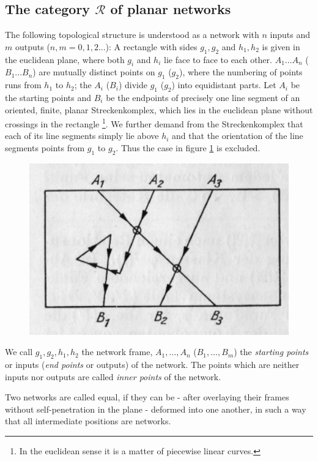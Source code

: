 \documentclass{article}
\begin{document}
\subsection{The category $\mathcal{R}$ of planar networks}
The following topological structure is understood as a network with $n$ inputs and $m$ outputs ($n, m = 0, 1, 2...$):
A rectangle with sides $g_1, g_2$ and $h_1, h_2$ is given in the euclidean plane, where both $g_i$ and $h_i$ lie face to face to each other. $A_1 \ldots A_n$ ($B_1 \ldots B_n$) are mutually distinct points on $g_1$ ($g_2$), where the numbering of points runs from $h_1$ to $h_2$; the $A_i$ ($B_i$) divide $g_1$ ($g_2$) into equidistant parts. 
Let $A_i$ be the starting points and $B_i$ be the endpoints of precisely one line segment of an oriented, finite, planar Streckenkomplex, which lies in the euclidean plane without crossings in the rectangle \footnote{In the euclidean sense it is a matter of piecewise linear curves. }. We further demand from the Streckenkomplex that each of its line segments simply lie above $h_i$ and that the orientation of the line segments points from $g_1$ to $g_2$. Thus the case in figure \ref{fig:figure3} is
excluded.
\begin{figure}
\includegraphics[]{figure3.png}
\caption{}
\label{fig:figure3}
\end{figure}

We call $g_1, g_2, h_1, h_2$ the network frame, $A_1, \ldots, A_n$ ($B_1, \ldots, B_m$) the \emph{starting points} or inputs (\emph{end points} or outputs) of the network. The points which are neither inputs nor outputs are called \emph{inner points} of the network.

Two networks are called equal, if they can be - after overlaying their frames without self-penetration in the plane - deformed into one another, in such a way that all intermediate positions are networks. 
\end{document}
